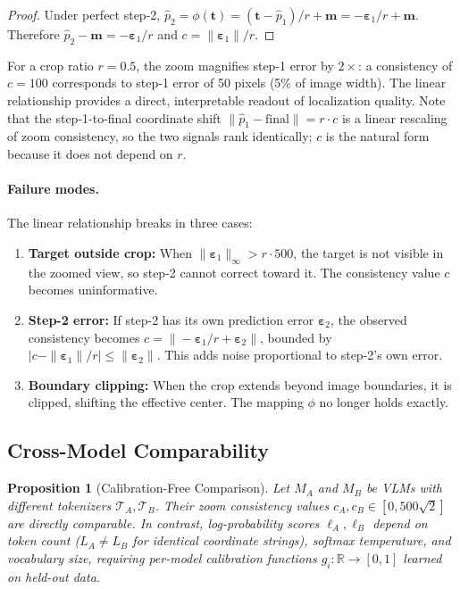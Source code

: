 \documentclass{article}
\newtheorem{proposition}{Proposition}
\begin{document}
\begin{proof}
Under perfect step-2, $\hat{p}_2 = \phi(\mathbf{t}) = (\mathbf{t} - \hat{p}_1)/r + \mathbf{m} = -\boldsymbol{\varepsilon}_1/r + \mathbf{m}$. Therefore $\hat{p}_2 - \mathbf{m} = -\boldsymbol{\varepsilon}_1/r$ and $c = \|\boldsymbol{\varepsilon}_1\|/r$.
\end{proof}

For a crop ratio $r = 0.5$, the zoom magnifies step-1 error by $2\times$: a consistency of $c = 100$ corresponds to step-1 error of 50 pixels (5\% of image width). The linear relationship provides a direct, interpretable readout of localization quality. Note that the step-1-to-final coordinate shift $\|\hat{p}_1 - \text{final}\| = r \cdot c$ is a linear rescaling of zoom consistency, so the two signals rank identically; $c$ is the natural form because it does not depend on $r$.

\paragraph{Failure modes.} The linear relationship breaks in three cases:
\begin{enumerate}
    \item \textbf{Target outside crop:} When $\|\boldsymbol{\varepsilon}_1\|_\infty > r \cdot 500$, the target is not visible in the zoomed view, so step-2 cannot correct toward it. The consistency value $c$ becomes uninformative.
    \item \textbf{Step-2 error:} If step-2 has its own prediction error $\boldsymbol{\varepsilon}_2$, the observed consistency becomes $c = \|{-}\boldsymbol{\varepsilon}_1/r + \boldsymbol{\varepsilon}_2\|$, bounded by $|c - \|\boldsymbol{\varepsilon}_1\|/r| \leq \|\boldsymbol{\varepsilon}_2\|$. This adds noise proportional to step-2's own error.
    \item \textbf{Boundary clipping:} When the crop extends beyond image boundaries, it is clipped, shifting the effective center. The mapping $\phi$ no longer holds exactly.
\end{enumerate}

\subsection{Cross-Model Comparability}

\begin{proposition}[Calibration-Free Comparison]\label{prop:calibration}
Let $M_A$ and $M_B$ be VLMs with different tokenizers $\mathcal{T}_A, \mathcal{T}_B$. Their zoom consistency values $c_A, c_B \in [0, 500\sqrt{2}]$ are directly comparable. In contrast, log-probability scores $\ell_A, \ell_B$ depend on token count ($L_A \neq L_B$ for identical coordinate strings), softmax temperature, and vocabulary size, requiring per-model calibration functions $g_i: \mathbb{R} \to [0,1]$ learned on held-out data.
\end{proposition}
\end{document}
